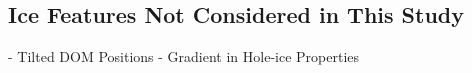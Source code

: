 
\subsection{Ice Features Not Considered in This Study}
\label{sec:ice_features_not_considered}

- Tilted DOM Positions
- Gradient in Hole-ice Properties


